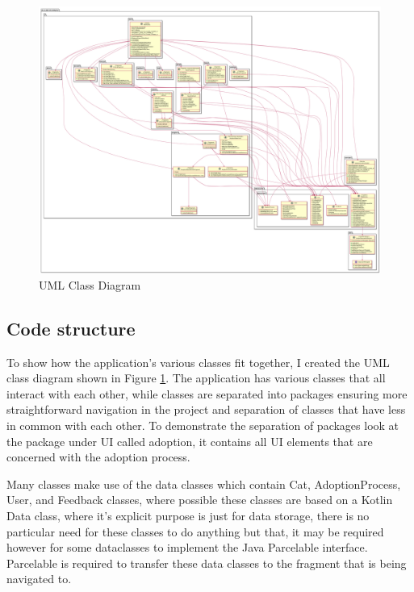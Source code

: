     \begin{landscape}
        \begin{figure} [htbp!]
            \centering
            \includegraphics[scale=0.18]{Images/ClassDiagram.png}
            \caption{UML Class Diagram}
            \label{fig:classDiagram}
        \end{figure}
    \end{landscape}
    \subsection{Code structure}
    
    To show how the application's various classes fit together, I created the UML class diagram shown in Figure \ref{fig:classDiagram}. The application has various classes that all interact with each other, while classes are separated into packages ensuring more straightforward navigation in the project and separation of classes that have less in common with each other. To demonstrate the separation of packages look at the package under UI called adoption, it contains all UI elements that are concerned with the adoption process. 
    
    Many classes make use of the data classes which contain Cat, AdoptionProcess, User, and Feedback classes, where possible these classes are based on a Kotlin Data class, where it's explicit purpose is just for data storage, there is no particular need for these classes to do anything but that, it may be required however for some dataclasses to implement the Java Parcelable interface. Parcelable is required to transfer these data classes to the fragment that is being navigated to.

